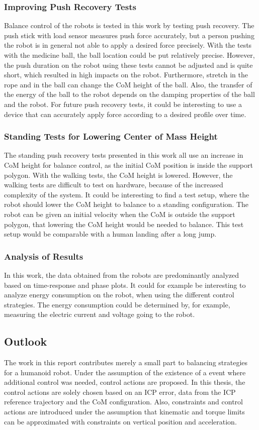 \subsubsection{Improving Push Recovery Tests}
Balance control of the robots is tested in this work by testing push recovery. The push stick with load sensor \cite{iload} measures push force accurately, but a person pushing the robot is in general not able to apply a desired force precisely. With the tests with the medicine ball, the ball location could be put relatively precise. However, the push duration on the robot using these tests cannot be adjusted and is quite short, which resulted in high impacts on the robot. Furthermore, stretch in the rope and in the ball can change the \ac{CoM} height of the ball. Also, the transfer of the energy of the ball to the robot depends on the damping properties of the ball and the robot. For future push recovery tests, it could be interesting to use a device that can accurately apply force according to a desired profile over time.
\subsubsection{Standing Tests for Lowering Center of Mass Height}
The standing push recovery tests presented in this work all use an increase in \ac{CoM} height for balance control, as the initial \ac{CoM} position is inside the support polygon. With the walking tests, the \ac{CoM} height is lowered. However, the walking tests are difficult to test on hardware, because of the increased complexity of the system. It could be interesting to find a test setup, where the robot should lower the \ac{CoM} height to balance to a standing configuration. The robot can be given an initial velocity when the \ac{CoM} is outside the support polygon, that lowering the \ac{CoM} height would be needed to balance. This test setup would be comparable with a human landing after a long jump.
\subsubsection{Analysis of Results}
In this work, the data obtained from the robots are predominantly analyzed based on time-response and phase plots. It could for example be interesting to analyze energy consumption on the robot, when using the different control strategies. The energy consumption could be determined by, for example, measuring the electric current and voltage going to the robot.

\subsection{Outlook}
The work in this report contributes merely a small part to balancing strategies for a humanoid robot. Under the assumption of the existence of a event where additional control was needed, control actions are proposed. In this thesis, the control actions are solely chosen based on an \ac{ICP} error, data from the \ac{ICP} reference trajectory and the \ac{CoM} configuration. Also, constraints and control actions are introduced under the assumption that kinematic and torque limits can be approximated with constraints on vertical position and acceleration. 

